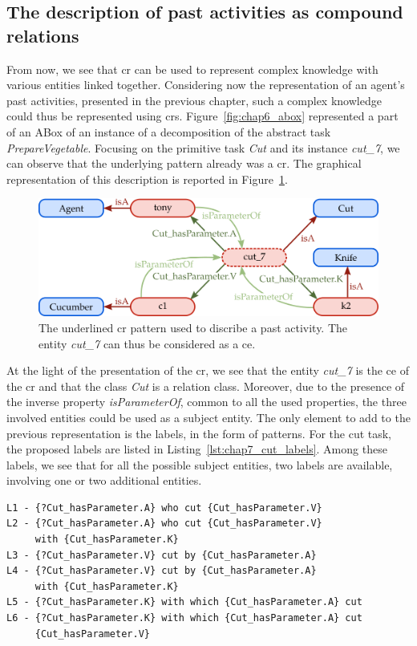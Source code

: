 \subsection{The description of past activities as compound relations}

From now, we see that \acrlong{cr} can be used to represent complex knowledge with various entities linked together. Considering now the representation of an agent's past activities, presented in the previous chapter, such a complex knowledge could thus be represented using \acrshort{cr}s. Figure~\ref{fig:chap6_abox} represented a part of an ABox of an instance of a decomposition of the abstract task \textit{PrepareVegetable}. Focusing on the primitive task \textit{Cut} and its instance \textit{cut\_7}, we can observe that the underlying pattern already was a \acrshort{cr}. The graphical representation of this description is reported in Figure~\ref{fig:chap7_cut7}.

\begin{figure}[ht!]
\centering
\includegraphics[scale=0.4]{figures/chapter7/cut7.png}
\caption{\label{fig:chap7_cut7} The underlined \acrlong{cr} pattern used to discribe a past activity. The entity \textit{cut\_7} can thus be considered as a \acrlong{ce}. }
\end{figure}

At the light of the presentation of the \acrshort{cr}, we see that the entity \textit{cut\_7} is the \acrlong{ce} of the \acrlong{cr} and that the class \textit{Cut} is a relation class. Moreover, due to the presence of the inverse property \textit{isParameterOf}, common to all the used properties, the three involved entities could be used as a subject entity. The only element to add to the previous representation is the labels, in the form of patterns. For the cut task, the proposed labels are listed in Listing~\ref{lst:chap7_cut_labels}. Among these labels, we see that for all the possible subject entities, two labels are available, involving one or two additional entities.

\begin{lstlisting}[frame=single, caption={ The set of labels usable to discribe the compound relation representing an instance of a cut primitive task.}, label={lst:chap7_cut_labels}, captionpos=b, style=Labels, mathescape=true]
L1 - {?Cut_hasParameter.A} who cut {Cut_hasParameter.V}
L2 - {?Cut_hasParameter.A} who cut {Cut_hasParameter.V} 
     with {Cut_hasParameter.K}
L3 - {?Cut_hasParameter.V} cut by {Cut_hasParameter.A}
L4 - {?Cut_hasParameter.V} cut by {Cut_hasParameter.A} 
     with {Cut_hasParameter.K}
L5 - {?Cut_hasParameter.K} with which {Cut_hasParameter.A} cut
L6 - {?Cut_hasParameter.K} with which {Cut_hasParameter.A} cut 
     {Cut_hasParameter.V}
\end{lstlisting}

